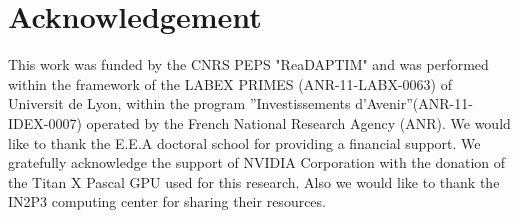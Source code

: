 \documentclass{article}
\begin{document}
\section{Acknowledgement}
This work was funded by the CNRS PEPS "ReaDAPTIM" and was performed within the framework of the LABEX PRIMES (ANR-11-LABX-0063) of Universit de Lyon, within the program ”Investissements d’Avenir”(ANR-11-IDEX-0007) operated by the French National Research Agency (ANR). We would like to thank the E.E.A doctoral school for providing a financial support.
We gratefully acknowledge the support of NVIDIA Corporation with the donation of the Titan X Pascal GPU used for this research. Also we would like to thank the IN2P3 computing center for sharing their resources.

\end{document}
